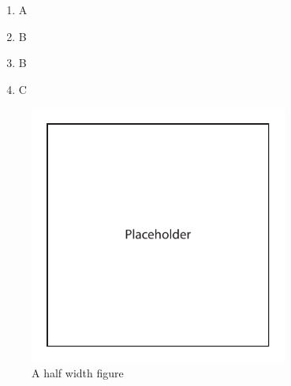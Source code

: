 \documentclass{epsrc}
\begin{document}
\begin{enumerate}[label=\bfseries Objective \arabic*:, align=left]
	\item A
	\item B
	\item B
	\item C
\end{enumerate}

\lipsum[25-26]\citeB{}

\begin{figure}
\vspace{-11pt}
	\begin{center}
		\includegraphics[width=8.5cm]{img/placeholder_image}
			\vspace{-30pt}
		\caption{A half width figure}
		\label{fig:half}
	\end{center}
\end{figure}

\lipsum[27-30]


\end{document}
